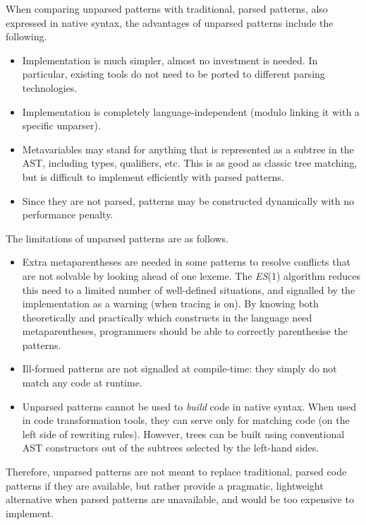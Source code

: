 When comparing unparsed patterns with traditional, parsed patterns,
also expressed in native syntax, the advantages of unparsed patterns
include the following.
\begin{itemize}

  \item Implementation is much simpler, almost no investment is
    needed. In particular, existing tools do not need to be ported to
    different parsing technologies.

  \item Implementation is completely language\hyp{}independent (modulo
    linking it with a specific unparser).

  \item Meta\-variables may stand for anything that is represented as
    a subtree in the AST, including types, qualifiers, etc. This is as
    good as classic tree matching, but is difficult to implement
    efficiently with parsed patterns.

  \item Since they are not parsed, patterns may be constructed
    dynamically with no performance penalty.

\end{itemize}
The limitations of unparsed patterns are as follows.
\begin{itemize}

  \item Extra meta\-parentheses are needed in some patterns to resolve
    conflicts that are not solvable by looking ahead of one
    lexeme. The \textit{ES}(1) algorithm reduces this need to a
    limited number of well\hyp{}defined situations, and signalled by
    the implementation as a warning (when tracing is on). By knowing
    both theoretically and practically which constructs in the
    language need meta\-parentheses, programmers should be able to
    correctly parenthesise the patterns.

  \item Ill\hyp{}formed patterns are not signalled at
    compile\hyp{}time: they simply do not match any code at
    runtime.

  \item Unparsed patterns cannot be used to \emph{build} code in
    native syntax. When used in code transformation tools, they can
    serve only for matching code (on the left side of rewriting
    rules). However, trees can be built using conventional AST
    constructors out of the subtrees selected by the left\hyp{}hand
    sides. 

\end{itemize}
Therefore, unparsed patterns are not meant to replace traditional,
parsed code patterns if they are available, but rather provide a
pragmatic, lightweight alternative when parsed patterns are
unavailable, and would be too expensive to implement.
